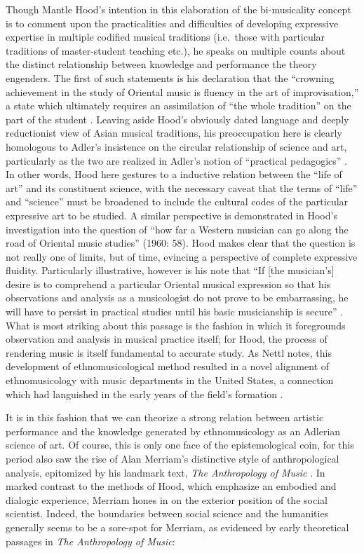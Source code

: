 Though Mantle Hood's intention in this elaboration of the bi-musicality
concept is to comment upon the practicalities and difficulties of
developing expressive expertise in multiple codified musical traditions
(i.e.~those with particular traditions of master-student teaching etc.),
he speaks on multiple counts about the distinct relationship between
knowledge and performance the theory engenders. The first of such
statements is his declaration that the ``crowning achievement in the
study of Oriental music is fluency in the art of improvisation,'' a
state which ultimately requires an assimilation of ``the whole
tradition'' on the part of the student
\autocite[58]{hood_challenge_1960}. Leaving aside Hood's obviously dated
language and deeply reductionist view of Asian musical traditions, his
preoccupation here is clearly homologous to Adler's insistence on the
circular relationship of science and art, particularly as the two are
realized in Adler's notion of ``practical pedagogics''
\autocite[16]{mugglstone_guido_1983}. In other words, Hood here gestures
to a inductive relation between the ``life of art'' and its constituent
science, with the necessary caveat that the terms of ``life'' and
``science'' must be broadened to include the cultural codes of the
particular expressive art to be studied. A similar perspective is
demonstrated in Hood's investigation into the question of ``how far a
Western musician can go along the road of Oriental music studies''
(1960: 58). Hood makes clear that the question is not really one of
limits, but of time, evincing a perspective of complete expressive
fluidity. Particularly illustrative, however is his note that ``If
{[}the musician's{]} desire is to comprehend a particular Oriental
musical expression so that his observations and analysis as a
musicologist do not prove to be embarrassing, he will have to persist in
practical studies until his basic musicianship is secure''
\autocite[58]{hood_challenge_1960}. What is most striking about this
passage is the fashion in which it foregrounds observation and analysis
in musical practice itself; for Hood, the process of rendering music is
itself fundamental to accurate study. As Nettl notes, this development
of ethnomusicological method resulted in a novel alignment of
ethnomusicology with music departments in the United States, a
connection which had languished in the early years of the field's
formation \autocite*[22]{nettl_what_1964}.

It is in this fashion that we can theorize a strong relation between
artistic performance and the knowledge generated by ethnomusicology as
an Adlerian science of art. Of course, this is only one face of the
epistemological coin, for this period also saw the rise of Alan
Merriam's distinctive style of anthropological analysis, epitomized by
his landmark text, \emph{The Anthropology of Music}
\autocite*{merriam_anthropology_1964}. In marked contrast to the methods
of Hood, which emphasize an embodied and dialogic experience, Merriam
hones in on the exterior position of the social scientist. Indeed, the
boundaries between social science and the humanities generally seems to
be a sore-spot for Merriam, as evidenced by early theoretical passages
in \emph{The Anthropology of Music}:

